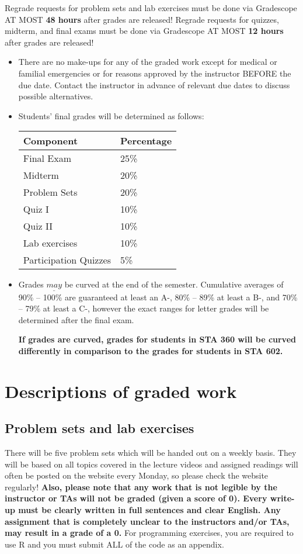 \documentclass[11pt, a4paper]{article}
\begin{document}
Regrade requests for problem sets and lab exercises must be done via Gradescope AT MOST \textbf{48 hours} after grades are released! Regrade requests for quizzes, midterm, and final exams must be done via Gradescope AT MOST \textbf{12 hours} after grades are released!
\begin{itemize}[label= {\color{darkblue}{\ArrowBoldRightStrobe}}]
	\item There are no make-ups for any of the graded work except for medical or familial emergencies or for reasons approved by the instructor BEFORE the due date. Contact the instructor in advance of relevant due dates to discuss possible alternatives. 
	
	\item Students' final grades will be determined as follows:
	\begin{table}[h]
		\centering
		\begin{tabular}{ll}
			Component & Percentage \\ 
			\hline
			Final Exam & 25\% \\ 
			Midterm & 20\% \\
			Problem Sets & 20\% \\
			Quiz I & 10\% \\
			Quiz II & 10\% \\
			Lab exercises & 10\% \\
			Participation Quizzes & 5\% \\
			\hline 
		\end{tabular}
	\end{table}

	\item Grades $\underline{may}$ be curved at the end of the semester. Cumulative averages of 90\% -- 100\% are guaranteed at least an A-, 80\% -- 89\% at least a B-, and 70\% -- 79\% at least a C-, however the exact ranges for letter grades will be determined after the final exam. 
	
	\textbf{If grades are curved, grades for students in STA 360 will be curved differently in comparison to the grades for students in STA 602.}
	
\end{itemize}


\section{Descriptions of graded work}
\subsection{Problem sets and lab exercises}
There will be five problem sets which will be handed out on a weekly basis. They will be based on all topics covered in the lecture videos and assigned readings will often be posted on the website every Monday, so please check the website regularly! \textbf{Also, please note that any work that is not legible by the instructor or TAs will not be graded (given a score  of 0). Every write-up must be clearly written in full sentences and clear English. Any assignment that is completely unclear to the instructors and/or TAs, may result in a grade of a 0.} For programming exercises, you are required to use R and you must submit ALL of the code as an appendix.  
\end{document}
